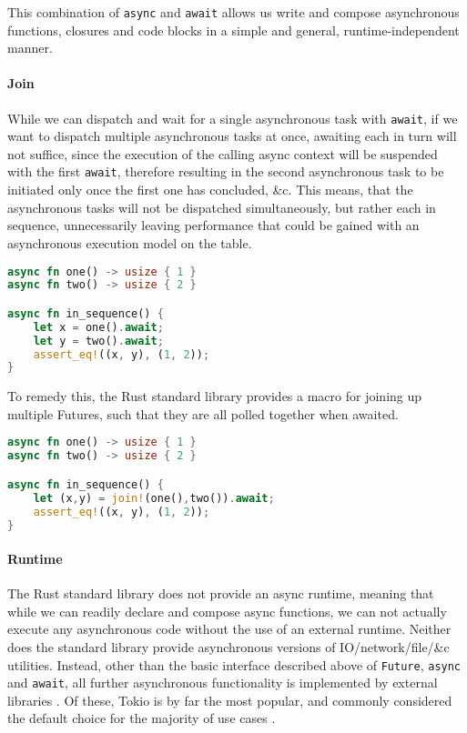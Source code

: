 \documentclass[a4paper,UKenglish,cleveref, autoref, thm-restate]{lipics-v2021}
\begin{document}
This combination of \verb|async| and \verb|await| allows us write and compose asynchronous functions, closures and code blocks in a simple and general, runtime-independent manner.

\paragraph*{Join}

While we can dispatch and wait for a single asynchronous task with \verb|await|, if we want to dispatch multiple asynchronous tasks at once, awaiting each in turn will not suffice, since the execution of the calling async context will be suspended with the first \verb|await|, therefore resulting in the second asynchronous task to be initiated only once the first one has concluded, \&c. This means, that the asynchronous tasks will not be dispatched simultaneously, but rather each in sequence, unnecessarily leaving performance that could be gained with an asynchronous execution model on the table.

\begin{minipage}{\linewidth}
\begin{lstlisting}[language=Rust,caption={Sequential await},captionpos=t]
async fn one() -> usize { 1 }
async fn two() -> usize { 2 }

async fn in_sequence() {
    let x = one().await;
    let y = two().await;
    assert_eq!((x, y), (1, 2));
}
\end{lstlisting}
\end{minipage}

To remedy this, the Rust standard library provides a macro for joining up multiple Futures, such that they are all polled together when awaited.

\begin{minipage}{\linewidth}
\begin{lstlisting}[language=Rust,caption={Joined await},captionpos=t]
async fn one() -> usize { 1 }
async fn two() -> usize { 2 }

async fn in_sequence() {
    let (x,y) = join!(one(),two()).await;
    assert_eq!((x, y), (1, 2));
}
\end{lstlisting}
\end{minipage}

\paragraph*{Runtime}

The Rust standard library does not provide an async runtime, meaning that while we can readily declare and compose async functions, we can not actually execute any asynchronous code without the use of an external runtime. Neither does the standard library provide asynchronous versions of IO/network/file/\&c utilities. Instead, other than the basic interface described above of \verb|Future|, \verb|async| and \verb|await|, all further asynchronous functionality is implemented by external libraries \cite{TheAsync92:online}. Of these, Tokio is by far the most popular, and commonly considered the default choice for the majority of use cases \cite{AsyncRus83:online}.
\end{document}
